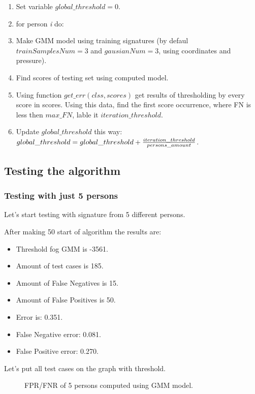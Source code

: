 \documentclass{article}
\begin{document}
\begin{enumerate}
    \item Set variable \( global\_threshold = 0\).
    \item for person 	\textit{i} do:
    \item \quad Make GMM model using training signatures (by defaul \(trainSamplesNum = 3\) and \newline \(gausianNum = 3\), using coordinates and pressure).
    \item \quad Find scores of testing set using computed model.
    \item \quad Using function \( get\_err( clss, scores ) \) get results of thresholding by every score in scores. Using this data, find the first score occurrence, where FN is less then \(max\_FN\), lable it \( iteration\_threshold\).
    \item \quad Update \( global\_threshold\) this way: \( global\_threshold = global\_threshold + {iteration\_threshold \over persons\_amount} \).
\end{enumerate}


\subsection{Testing the algorithm}
\subsubsection{Testing with just 5 persons}
Let's start testing with signature from 5 different persons.

After making 50 start of algorithm the results are:
\begin{itemize}
    \item Threshold fog GMM is -3561.
    \item Amount of test cases is 185.
    \item Amount of False Negatives is 15.
    \item Amount of False Positives is 50.
    \item Error is: 0.351.
    \item False Negative error: 0.081.
    \item False Positive error: 0.270.
\end{itemize}

Let's put all test cases on the graph with threshold.

\begin{figure}[htbp] 
    \centering
    \def\svgscale{0.7}
    
    \caption{FPR/FNR of 5 persons computed using GMM model.}
    \label{GMM_5persons}
\end{figure}
\end{document}
